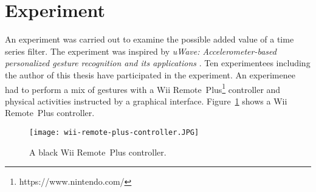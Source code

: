 \section{Experiment}
An experiment was carried out to examine the possible added value of a time series filter. The experiment was inspired
by \textit{uWave: Accelerometer-based personalized gesture recognition and its applications} \cite{liu2009uwave}. Ten
experimentees including the author of this thesis have participated in the experiment. An experimenee had to perform a
mix of gestures with a Wii Remote\texttrademark~Plus\footnote{https://www.nintendo.com/} controller and physical
activities instructed by a graphical interface. Figure~\ref{fig:wii-remote} shows a Wii Remote\texttrademark~Plus
controller.
\begin{figure}
    \begin{center}
        \texttt{[image: wii-remote-plus-controller.JPG]}
    \end{center}
    \caption{A black Wii Remote\texttrademark~Plus controller.}
    \label{fig:wii-remote}
\end{figure}



